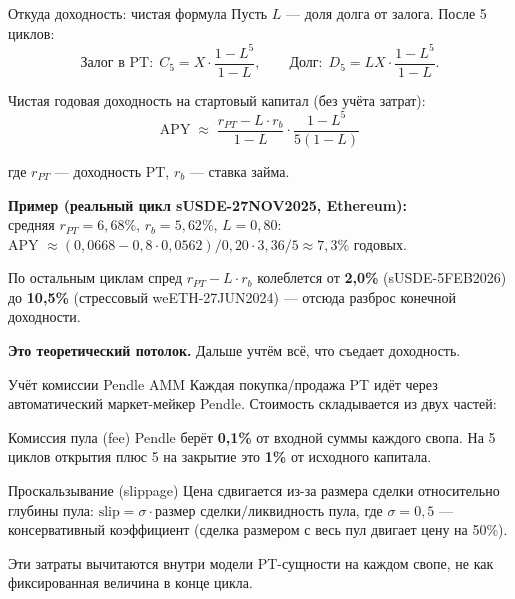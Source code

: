 \documentclass[11pt,aspectratio=169]{beamer}
\begin{document}
\begin{frame}{Откуда доходность: чистая формула}
  Пусть $L$ --- доля долга от залога. После 5 циклов:
  \[
    \text{Залог в PT}: \;C_5 = X \cdot \frac{1-L^5}{1-L}, \qquad
    \text{Долг}: \;D_5 = LX \cdot \frac{1-L^5}{1-L}.
  \]

  Чистая годовая доходность на стартовый капитал (без учёта затрат):
  \[
    \boxed{\;\text{APY} \;\approx\;
      \frac{r_{PT} - L \cdot r_b}{1-L} \cdot \frac{1-L^5}{5(1-L)}\;}
  \]

  где $r_{PT}$ --- доходность PT, $r_b$ --- ставка займа.

  \vspace{0.4em}
  \textbf{Пример (реальный цикл sUSDE-27NOV2025, Ethereum):}\\
  средняя $r_{PT} = 6{,}68\%$, $r_b = 5{,}62\%$, $L = 0{,}80$:\\
  APY $\approx (0{,}0668 - 0{,}8 \cdot 0{,}0562)/0{,}20 \cdot 3{,}36/5 \approx 7{,}3\%$ годовых.

  \vspace{0.3em}
  По остальным циклам спред $r_{PT} - L \cdot r_b$ колеблется
  от \textbf{2{,}0\%} (sUSDE-5FEB2026) до \textbf{10{,}5\%}
  (стрессовый weETH-27JUN2024) --- отсюда разброс конечной доходности.

  \vspace{0.4em}
  \textbf{Это теоретический потолок.} Дальше учтём всё, что съедает доходность.
\end{frame}

\begin{frame}{Учёт комиссии Pendle AMM}
  \footnotesize
  Каждая покупка/продажа PT идёт через автоматический маркет-мейкер Pendle.
  Стоимость складывается из двух частей:

  \vspace{0.3em}
  \begin{block}{Комиссия пула (fee)}
    Pendle берёт \textbf{0{,}1\%} от входной суммы каждого свопа.
    На 5 циклов открытия плюс 5 на закрытие это \textbf{1\%}
    от исходного капитала.
  \end{block}

  \vspace{0.2em}
  \begin{block}{Проскальзывание (slippage)}
    Цена сдвигается из-за размера сделки относительно глубины пула:
    $\text{slip} = \sigma \cdot \text{размер сделки}/\text{ликвидность пула}$,
    где $\sigma = 0{,}5$ --- консервативный коэффициент (сделка
    размером с весь пул двигает цену на 50\%).
  \end{block}

  \vspace{0.3em}
  \normalsize
  Эти затраты вычитаются внутри модели PT-сущности на каждом свопе,
  не как фиксированная величина в конце цикла.
\end{frame}
\end{document}
